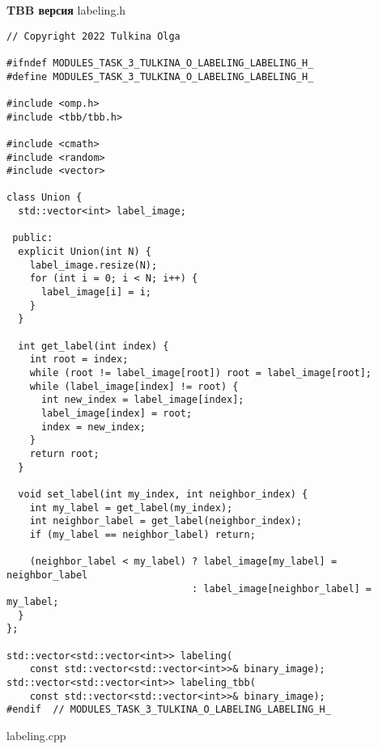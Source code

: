\documentclass[12pt]{article}
\begin{document}
\textbf{TBB версия}
\newline
\newline labeling.h
\begin{lstlisting}
// Copyright 2022 Tulkina Olga

#ifndef MODULES_TASK_3_TULKINA_O_LABELING_LABELING_H_
#define MODULES_TASK_3_TULKINA_O_LABELING_LABELING_H_

#include <omp.h>
#include <tbb/tbb.h>

#include <cmath>
#include <random>
#include <vector>

class Union {
  std::vector<int> label_image;

 public:
  explicit Union(int N) {
    label_image.resize(N);
    for (int i = 0; i < N; i++) {
      label_image[i] = i;
    }
  }

  int get_label(int index) {
    int root = index;
    while (root != label_image[root]) root = label_image[root];
    while (label_image[index] != root) {
      int new_index = label_image[index];
      label_image[index] = root;
      index = new_index;
    }
    return root;
  }

  void set_label(int my_index, int neighbor_index) {
    int my_label = get_label(my_index);
    int neighbor_label = get_label(neighbor_index);
    if (my_label == neighbor_label) return;

    (neighbor_label < my_label) ? label_image[my_label] = neighbor_label
                                : label_image[neighbor_label] = my_label;
  }
};

std::vector<std::vector<int>> labeling(
    const std::vector<std::vector<int>>& binary_image);
std::vector<std::vector<int>> labeling_tbb(
    const std::vector<std::vector<int>>& binary_image);
#endif  // MODULES_TASK_3_TULKINA_O_LABELING_LABELING_H_
\end{lstlisting}
labeling.cpp
\end{document}
